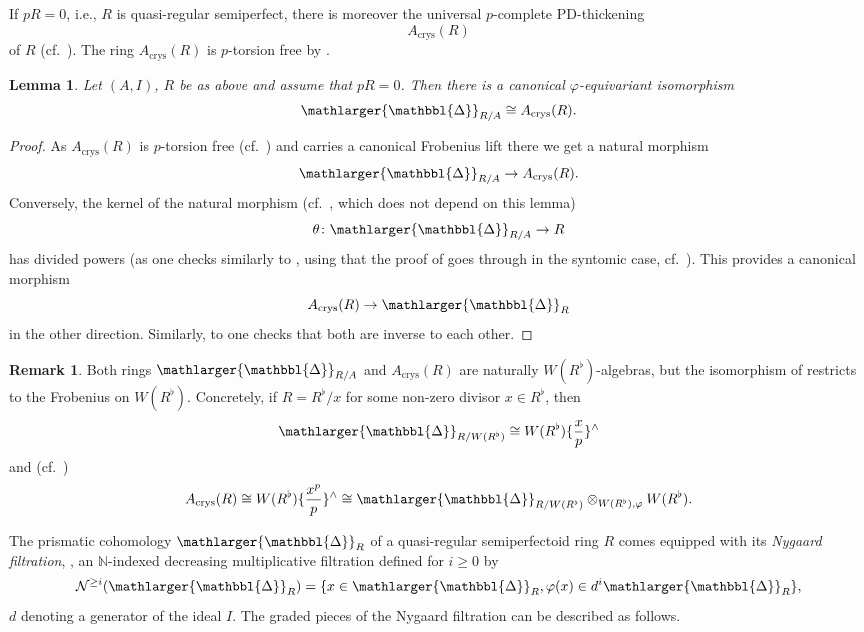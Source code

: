 \documentclass{amsart}
\newcommand{\prism}{{\mathlarger{\mathbbl{\Delta}}}}
\theoremstyle{plain}
\newtheorem{lemma}[theorem]{Lemma}
\theoremstyle{definition}
\newtheorem{remark}[theorem]{Remark}
\newcommand{\crys}{\mathrm{crys}}
\newcommand{\orange}[1]{{\color{black}#1}}
\begin{document}
If $pR=0$, i.e., $R$ is quasi-regular semiperfect, there is moreover the universal $p$-complete PD-thickening
$$
A_\crys(R)
$$
of $R$ (cf.\ \cite[Proposition 4.1.3]{scholze_weinstein_moduli_of_p_divisible_groups}).
The ring $A_\crys(R)$ is $p$-torsion free by \cite[Theorem 8.14]{bhatt_morrow_scholze_topological_hochschild_homology}.

\begin{lemma}
  \label{sec:prism-cohom-quasi-lemma-for-qr-semiperfect-prism-isomorphic-to-acrys} Let $(A,I)$, $R$ be as above and assume that $pR=0$. Then there is a canonical $\varphi$-equivariant isomorphism
  $$
  \prism_{R/A}\cong A_\crys(R).
  $$
\end{lemma}
\begin{proof}
  As $A_\crys(R)$ is $p$-torsion free (cf.\ \cite[Theorem 8.14]{bhatt_morrow_scholze_topological_hochschild_homology}) and carries a canonical Frobenius lift there we get a natural morphism
  $$
  \prism_{R/A}\to A_\crys(R).
  $$
  Conversely, the kernel of the natural morphism (cf.\ , which does not depend on this lemma)
  $$
  \theta\colon \prism_{R/A}\to R
  $$
  has divided powers (as one checks similarly to \cite[Proposition 8.12]{bhatt_morrow_scholze_topological_hochschild_homology}, using that the proof of  goes through in the syntomic case, cf.\ ). This provides a canonical morphism
  $$
  A_\crys(R)\to \prism_R
  $$
  in the other direction. Similarly, to \cite[Theorem 8.14]{bhatt_morrow_scholze_topological_hochschild_homology} one checks that both are inverse to each other.
\end{proof}

\begin{remark}
Both rings $\prism_{R/A}$ and $A_\crys(R)$ are naturally $W(R^\flat)$-algebras, but the isomorphism of  restricts to the Frobenius on $W(R^\flat)$. Concretely, if $R=R^\flat/x$ for some non-zero divisor $x\in R^\flat$, then
$$
\prism_{R/W(R^\flat)}\cong W(R^\flat)\{\frac{x}{p}\}^\wedge
$$
and (cf.\ \cite[Corollary 2.37]{bhatt_scholze_prisms_and_prismatic_cohomology})
$$
A_\crys(R)\cong W(R^\flat)\{\frac{x^p}{p}\}^\wedge\cong \prism_{R/W(R^\flat)}\otimes_{W(R^\flat),\varphi} W(R^\flat).
$$
\end{remark}

\orange{The prismatic cohomology $\prism_R$ of a quasi-regular semiperfectoid ring $R$ comes equipped with its \textit{Nygaard filtration}, \cite[\S 12]{bhatt_scholze_prisms_and_prismatic_cohomology}, an $\mathbb{N}$-indexed decreasing multiplicative filtration defined for $i\geq 0$ by 
$$
\mathcal{N}^{\geq i}(\prism_R) = \{ x \in \prism_R, \varphi(x) \in d^i \prism_R \},
$$
$d$ denoting a generator of the  ideal $I$. The graded pieces of the Nygaard filtration can be described as follows.}
\end{document}
